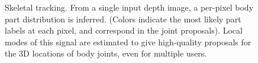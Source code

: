 \begin{figure}
	\centering
	\quad
	\caption{Skeletal tracking. From a single input depth image, a per-pixel body part distribution is inferred. (Colors indicate the most likely part labels at each pixel, and correspond in the joint proposals). Local modes of this signal are estimated to give high-quality proposals for the 3D locations of body joints, even for multiple users.}
	\label{fig:2-bg:skeleton}
\end{figure}

